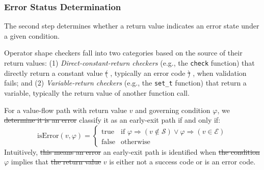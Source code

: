 \documentclass[manuscript,screen,review]{acmart}
\theoremstyle{indenteditalic}
\providecommand{\DIFaddtex}[1]{{\protect\color{blue}#1}} %
\providecommand{\DIFidentity}[1]{#1}
\providecommand{\DIFdeltex}[1]{{%
  \protect\color{red}%
  \normalfont\normalsize
  \let\textbf\DIFidentity
  \let\textit\DIFidentity
  \let\texttt\DIFidentity
  \let\textsc\DIFidentity
  \let\textsf\DIFidentity
  \let\emph\DIFidentity
  \let\uline\DIFidentity
  \sout{#1}%
}} %
\providecommand{\DIFaddbegin}{} %
\providecommand{\DIFaddend}{} %
\providecommand{\DIFdelbegin}{} %
\providecommand{\DIFdelend}{} %
\providecommand{\DIFadd}[1]{\texorpdfstring{\DIFaddtex{#1}}{#1}} %
\providecommand{\DIFdel}[1]{\texorpdfstring{\DIFdeltex{#1}}{}} %
\begin{document}
\subsubsection{Error Status Determination}\label{sec:design:error-determination}

The second step determines whether a return value indicates an error state under a given condition.

Operator shape checkers fall into two categories based on the source of their return values:
(1) \textit{Direct-constant-return checkers} (e.g., the \texttt{check} function) that directly return a constant value\DIFdelbegin \DIFdel{(}\DIFdelend \DIFaddbegin \DIFadd{, }\DIFaddend typically an error code\DIFdelbegin \DIFdel{) }\DIFdelend \DIFaddbegin \DIFadd{, }\DIFaddend when validation fails; and
(2) \textit{Variable-return checkers} (e.g., the \texttt{set\_t} function) that return a variable, typically the return value of another function call.

For a value-flow path with return value $v$ and governing condition $\varphi$, we \DIFdelbegin \DIFdel{determine it is an error }\DIFdelend \DIFaddbegin \DIFadd{classify it as an early-exit }\DIFaddend path if and only if:
\begin{equation}
	\text{isError}(v, \varphi) =
	\begin{cases}
		\text{true} & \text{if } \varphi \Rightarrow (v \notin \mathcal{S}) \lor \varphi \Rightarrow (v \in \mathcal{E}) \\
		\text{false} & \text{otherwise}
	\end{cases}
\end{equation}
Intuitively, \DIFdelbegin \DIFdel{this means an error }\DIFdelend \DIFaddbegin \DIFadd{an early-exit }\DIFaddend path is identified when \DIFdelbegin \DIFdel{the condition }\DIFdelend $\varphi$ implies that \DIFdelbegin \DIFdel{the return value }\DIFdelend $v$ is either not a success code or is an error code.
\end{document}
